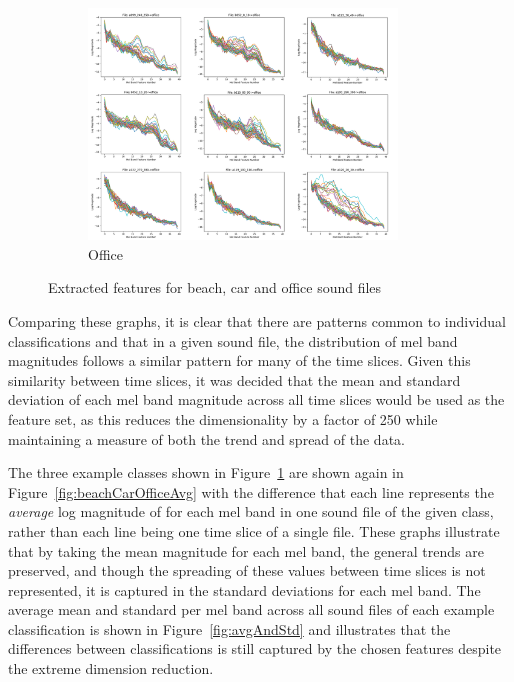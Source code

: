 \documentclass[11pt]{article}
\begin{document}
\begin{figure}[!htbp]
\begin{subfigure}[t]{0.54\textwidth}
		\includegraphics[width=0.9\textwidth]{figures/officegrid.png}
		\caption{Office}
	\end{subfigure}
	\caption{Extracted features for beach, car and office sound files}
	\label{fig:beachCarOffice}
\end{figure}

Comparing these graphs, it is clear that there are patterns common to individual classifications and that in a given sound file, the distribution of mel band magnitudes follows a similar pattern for many of the time slices. Given this similarity between time slices, it was decided that the mean and standard deviation of each mel band magnitude across all time slices would be used as the feature set, as this reduces the dimensionality by a factor of 250 while maintaining a measure of both the trend and spread of the data.

The three example classes shown in Figure~\ref{fig:beachCarOffice} are shown again in Figure~\ref{fig:beachCarOfficeAvg} with the difference that each line represents the \textit{average} log magnitude of for each mel band in one sound file of the given class, rather than each line being one time slice of a single file. These graphs illustrate that by taking the mean magnitude for each mel band, the general trends are preserved, and though the spreading of these values between time slices is not represented, it is captured in the standard deviations for each mel band. The average mean and standard per mel band across all sound files of each example classification is shown in Figure~\ref{fig:avgAndStd} and illustrates that the differences between classifications is still captured by the chosen features despite the extreme dimension reduction.
\end{document}
